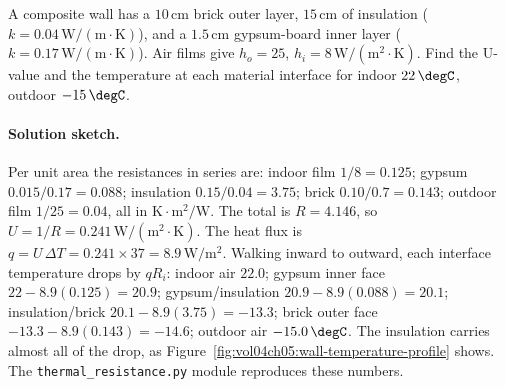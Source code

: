 \begin{exercise}
A composite wall has a $10\,\si{\centi\meter}$ brick outer layer,
$15\,\si{\centi\meter}$ of insulation ($k = 0.04\,\text{W}/(\text{m}
\cdot\si{\kelvin})$), and a $1.5\,\si{\centi\meter}$ gypsum-board
inner layer ($k = 0.17\,\text{W}/(\text{m}\cdot\si{\kelvin})$). Air
films give $h_o = 25$, $h_i = 8\,\text{W}/(\text{m}^2\cdot\si{
\kelvin})$. Find the U-value and the temperature at each material
interface for indoor $22\,\degC$, outdoor $-15\,\degC$.
\paragraph{Solution sketch.} Per unit area the resistances in series
are: indoor film $1/8 = 0.125$; gypsum $0.015/0.17 = 0.088$;
insulation $0.15/0.04 = 3.75$; brick $0.10/0.7 = 0.143$; outdoor film
$1/25 = 0.04$, all in $\si{\kelvin}\cdot\text{m}^2/\text{W}$. The total
is $R = 4.146$, so $U = 1/R = 0.241\,\text{W}/(\text{m}^2\cdot
\si{\kelvin})$. The heat flux is $q = U\,\Delta T = 0.241 \times 37 =
8.9\,\text{W}/\text{m}^2$. Walking inward to outward, each interface
temperature drops by $q R_i$: indoor air $22.0$; gypsum inner face
$22 - 8.9(0.125) = 20.9$; gypsum/insulation $20.9 - 8.9(0.088) = 20.1$;
insulation/brick $20.1 - 8.9(3.75) = -13.3$; brick outer face $-13.3 -
8.9(0.143) = -14.6$; outdoor air $-15.0\,\degC$. The insulation carries
almost all of the drop, as Figure~\ref{fig:vol04ch05:wall-temperature-profile}
shows. The \texttt{thermal\_resistance.py} module reproduces these
numbers.
\end{exercise}


